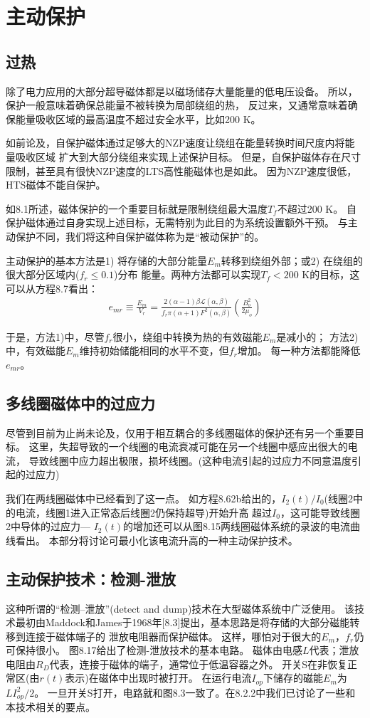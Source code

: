 \section{主动保护}
\subsection{过热}
除了电力应用的大部分超导磁体都是以磁场储存大量能量的低电压设备。
所以，保护一般意味着确保总能量不被转换为局部绕组的热，
反过来，又通常意味着确保能量吸收区域的最高温度不超过安全水平，比如200 K。

如前论及，自保护磁体通过足够大的NZP速度让绕组在能量转换时间尺度内将能量吸收区域
扩大到大部分绕组来实现上述保护目标。
但是，自保护磁体存在尺寸限制，甚至具有很快NZP速度的LTS高性能磁体也是如此。
因为NZP速度很低，HTS磁体不能自保护。

如8.1所述，磁体保护的一个重要目标就是限制绕组最大温度$T_f$不超过200 K。
自保护磁体通过自身实现上述目标，无需特别为此目的为系统设置额外干预。
与主动保护不同，我们将这种自保护磁体称为是“被动保护”的。

主动保护的基本方法是1) 将存储的大部分能量$E_m$转移到绕组外部；或2) 在绕组的很大部分区域内($f_r\le 0.1$)分布
能量。两种方法都可以实现$T_f<200$ K的目标，这可以从方程8.7看出：
\begin{align*}%
e_{mr}\equiv\frac{E_m}{V_r}=\frac{2(\alpha-1)\beta\mathcal{L}(\alpha,\beta)}{f_r\pi(\alpha+1)F^2(\alpha,\beta)}\left(\frac{B_{o}^{2}}{2\mu_o}\right) \tag{8.7}
\end{align*}

于是，方法1)中，尽管$f_r$很小，绕组中转换为热的有效磁能$E_m$是减小的；
方法2)中，有效磁能$E_m$维持初始储能相同的水平不变，但$f_r$增加。
每一种方法都能降低$e_{mr}$。

\subsection{多线圈磁体中的过应力}
尽管到目前为止尚未论及，仅用于相互耦合的多线圈磁体的保护还有另一个重要目标。
这里，失超导致的一个线圈的电流衰减可能在另一个线圈中感应出很大的电流，
导致线圈中应力超出极限，损坏线圈。(这种电流引起的过应力不同意温度引起的过应力)

我们在两线圈磁体中已经看到了这一点。
如方程8.62b给出的，$I_2(t)/I_0$(线圈2中的电流，线圈1进入正常态后线圈2仍保持超导)开始升高
超过$I_0$，这可能导致线圈2中导体的过应力---
$I_2(t)$的增加还可以从图8.15两线圈磁体系统的录波的电流曲线看出。
本部分将讨论可最小化该电流升高的一种主动保护技术。

\subsection{主动保护技术：检测-泄放}
这种所谓的“检测--泄放”(detect and dump)技术在大型磁体系统中广泛使用。
该技术最初由Maddock和James于1968年[8.3]提出，基本思路是将存储的大部分磁能转移到连接于磁体端子的
泄放电阻器而保护磁体。
这样，哪怕对于很大的$E_m$，$f_r$仍可保持很小。
图8.17给出了检测-泄放技术的基本电路。
磁体由电感$L$代表；泄放电阻由$R_D$代表，连接于磁体的端子，通常位于低温容器之外。
开关S在非恢复正常区(由$r(t)$表示)在磁体中出现时被打开。
在运行电流$I_{op}$下储存的磁能$E_m$为$LI_{op}^2/2$。
一旦开关S打开，电路就和图8.3一致了。在8.2.2中我们已讨论了一些和本技术相关的要点。

